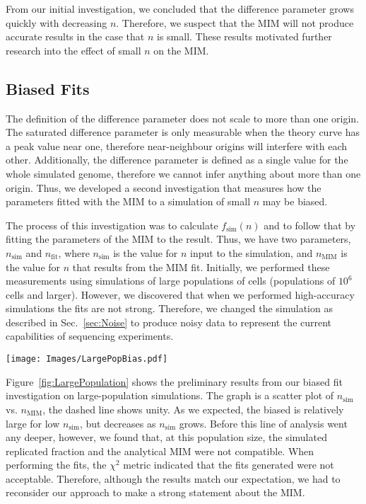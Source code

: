 		From our initial investigation, we concluded that the difference parameter grows quickly with decreasing $n$.
		Therefore, we suspect that the MIM will not produce accurate results in the case that $n$ is small.
		These results motivated further research into the effect of small $n$ on the MIM.
		
		
		\subsection{Biased Fits}
		\label{subsec:BiasedFits}
		
		The definition of the difference parameter does not scale to more than one origin.
		The saturated difference parameter is only measurable when the theory curve has a peak value near one, therefore near-neighbour origins will interfere with each other.
		Additionally, the difference parameter is defined as a single value for the whole simulated genome, therefore we cannot infer anything about more than one origin.
		Thus, we developed a second investigation that measures how the parameters fitted with the MIM to a simulation of small $n$ may be biased.
		
		The process of this investigation was to calculate $f_\text{sim}(n)$ and to follow that by fitting the parameters of the MIM to the result.
		Thus, we have two parameters, $n_\text{sim}$ and $n_\text{fit}$, where $n_\text{sim}$ is the value for $n$ input to the simulation, and $n_\text{MIM}$ is the value for $n$ that results from the MIM fit.
		Initially, we performed these measurements using simulations of large populations of cells (populations of $10^6$ cells and larger).
		However, we discovered that when we performed high-accuracy simulations the fits are not strong.
		Therefore, we changed the simulation as described in Sec.~\ref{sec:Noise} to produce noisy data to represent the current capabilities of sequencing experiments.
		
		\begin{SCfigure}[1][tbh]
			\texttt{[image: Images/LargePopBias.pdf]}
			\caption[Bias in MIM fit on Large-Population Simulations]{\label{fig:LargePopulation} Scatter plot of $n_\text{sim}$ vs. $n_\text{fit}$ for simulations of a large population.
			Red circles show the data, dashed line shows unity.
			There is a large bias for low $n_\text{sim}$ which decreases as $n_\text{sim}$ grows.
			}
		\end{SCfigure}
		
		Figure~\ref{fig:LargePopulation} shows the preliminary results from our biased fit investigation on large-population simulations.
		The graph is a scatter plot of $n_\text{sim}$ vs. $n_\text{MIM}$, the dashed line shows unity.
		As we expected, the biased is relatively large for low $n_\text{sim}$, but decreases as $n_\text{sim}$ grows.
		Before this line of analysis went any deeper, however, we found that, at this population size, the simulated replicated fraction and the analytical MIM were not compatible.
		When performing the fits, the $\chi^2$ metric indicated that the fits generated were not acceptable.
		Therefore, although the results match our expectation, we had to reconsider our approach to make a strong statement about the MIM.
		
